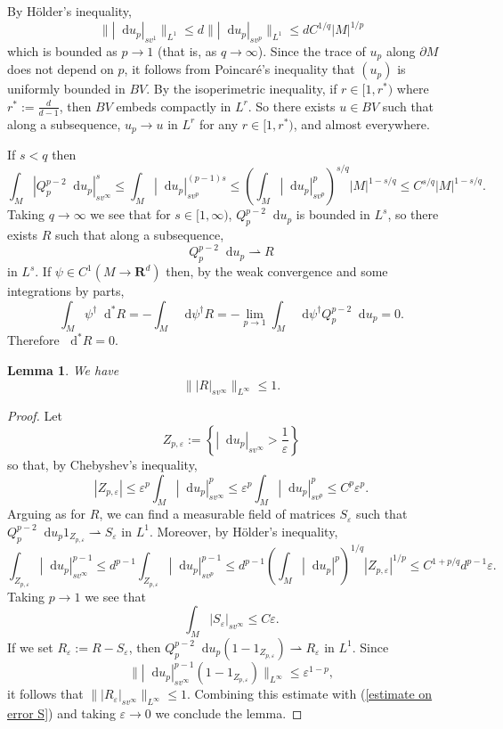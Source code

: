 \documentclass[reqno,11pt]{amsart}
\newcommand{\RR}{\mathbf{R}}
\newcommand*\dif{\mathop{}\!\mathrm{d}}
\newtheorem{lemma}[theorem]{Lemma}
\theoremstyle{definition}
\numberwithin{equation}{section}
\begin{document}
By H\"older's inequality,
$$\||\dif u_p|_{sv^1}\|_{L^1} \leq d \||\dif u_p|_{sv^p}\|_{L^1} \leq d C^{1/q} |M|^{1/p}$$
which is bounded as $p \to 1$ (that is, as $q \to \infty$).
Since the trace of $u_p$ along $\partial M$ does not depend on $p$, it follows from Poincar\'e's inequality that $(u_p)$ is uniformly bounded in $BV$.
By the isoperimetric inequality, if $r \in [1, r^*)$ where $r^* := \frac{d}{d - 1}$, then $BV$ embeds compactly in $L^r$.
So there exists $u \in BV$ such that along a subsequence, $u_p \to u$ in $L^r$ for any $r \in [1, r^*)$, and almost everywhere.

If $s < q$ then 
$$\int_M |Q_p^{p - 2} \dif u_p|_{sv^\infty}^s \leq \int_M |\dif u_p|_{sv^p}^{(p - 1)s} \leq \left(\int_M |\dif u_p|_{sv^p}^p\right)^{s/q} |M|^{1 - s/q} \leq C^{s/q} |M|^{1 - s/q}.$$
Taking $q \to \infty$ we see that for $s \in [1, \infty)$, $Q_p^{p - 2} \dif u_p$ is bounded in $L^s$, so there exists $R$ such that along a subsequence,
$$Q_p^{p - 2} \dif u_p \rightharpoonup R$$
in $L^s$.
If $\psi \in C^1(M \to \RR^d)$ then, by the weak convergence and some integrations by parts,
$$\int_M \psi^\dagger \dif^* R = -\int_M \dif \psi^\dagger R = -\lim_{p \to 1} \int_M \dif \psi^\dagger Q_p^{p - 2} \dif u_p = 0.$$
Therefore $\dif^* R = 0$.

\begin{lemma}
We have
$$\||R|_{sv^\infty}\|_{L^\infty} \leq 1.$$
\end{lemma}
\begin{proof}
Let 
$$Z_{p, \varepsilon} := \left\{|\dif u_p|_{sv^\infty} > \frac{1}{\varepsilon}\right\}$$
so that, by Chebyshev's inequality,
$$|Z_{p, \varepsilon}| \leq \varepsilon^p \int_M |\dif u_p|_{sv^\infty}^p \leq \varepsilon^p \int_M |\dif u_p|_{sv^p}^p \leq C^p \varepsilon^p.$$
Arguing as for $R$, we can find a measurable field of matrices $S_\varepsilon$ such that $Q_p^{p - 2} \dif u_p 1_{Z_{p, \varepsilon}} \rightharpoonup S_\varepsilon$ in $L^1$.
Moreover, by H\"older's inequality,
$$\int_{Z_{p, \varepsilon}} |\dif u_p|_{sv^\infty}^{p - 1} \leq d^{p - 1} \int_{Z_{p, \varepsilon}} |\dif u_p|_{sv^p}^{p - 1} \leq d^{p - 1} \left(\int_M |\dif u_p|^p\right)^{1/q} |Z_{p, \varepsilon}|^{1/p} \leq C^{1 + p/q} d^{p - 1} \varepsilon.$$
Taking $p \to 1$ we see that 
\begin{equation}\label{estimate on error S}
\int_M |S_\varepsilon|_{sv^\infty} \leq C\varepsilon.
\end{equation}
If we set $R_\varepsilon := R - S_\varepsilon$, then $Q_p^{p - 2} \dif u_p (1 - 1_{Z_{p, \varepsilon}}) \rightharpoonup R_\varepsilon$ in $L^1$.
Since 
$$\||\dif u_p|_{sv^\infty}^{p - 1} (1 - 1_{Z_{p, \varepsilon}})\|_{L^\infty} \leq \varepsilon^{1 - p},$$
it follows that $\||R_\varepsilon|_{sv^\infty}\|_{L^\infty} \leq 1$.
Combining this estimate with (\ref{estimate on error S}) and taking $\varepsilon \to 0$ we conclude the lemma.
\end{proof}
\end{document}
